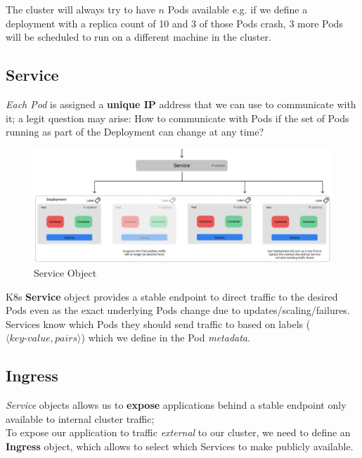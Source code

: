 The cluster will always try to have $n$ Pods available
e.g. if we define a deployment with a replica count of 10 and 3 of those Pods crash, 3
more Pods will be scheduled to run on a different machine in the cluster.

\subsection{Service}
\textit{Each Pod} is assigned a \textbf{unique IP} address that we can use to communicate with it;
a legit question may arise:
How to communicate with Pods if the set of Pods running as part of the Deployment can change at any time?

\begin{figure}[htbp]
   \centering
   \includegraphics{images/K8s_service.png}
   \caption{Service Object}
   \label{fig:K8s_service}
\end{figure}

K8s \textbf{Service} object provides a stable endpoint to direct traffic to the desired Pods
even as the exact underlying Pods change due to updates/scaling/failures.\\
Services know which Pods they should send traffic to based on labels ($\langle \textit{key-value},\textit{pairs}\rangle$) which we define in the Pod \textit{metadata}.

\subsection{Ingress}
\textit{Service} objects allows us to \textbf{expose} applications behind a stable endpoint only available to internal cluster traffic;\\
To expose our application to traffic \textit{external} to our cluster, we need to
define an \textbf{Ingress} object, which allows to select which Services to make publicly available.

